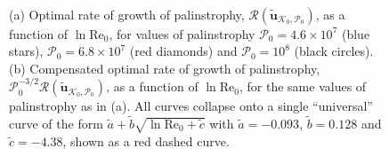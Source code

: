 \documentclass[11pt]{article}
\def\P{{\mathcal{P}}}
\def\R{{\mathcal{R}}}
\def\K{{\mathcal{K}}}
\newcommand{\Reyn}{\textrm{Re}}
\newcommand{\tuvecKP}{\widetilde{\mathbf{u}}_{\K_0,\P_0}}
\begin{document}
\begin{figure}
\linespread{1.1}
\setcounter{subfigure}{0}
\begin{center}
\\
\caption[Optimal $d\P/dt$ vs $\Reyn$]{
(a) Optimal rate of growth of palinstrophy, $\R(\tuvecKP)$, as a function of $\ln \Reyn_0$, 
for values of palinstrophy $\P_0 = 4.6\times 10^7$ (blue stars), $\P_0 = 6.8\times 10^7$ (red diamonds) and $\P_0 = 10^8$ (black circles). (b) Compensated optimal rate of growth of palinstrophy, $\P_0^{-3/2}\R(\tuvecKP)$, as a function of $\ln \Reyn_0$, for the same values of palinstrophy as in (a). All curves collapse onto a single ``universal'' curve of the form $\tilde{a} + \tilde{b}\sqrt{\ln \Reyn_0 + \tilde{c} }$ with $\tilde{a} = -0.093$, $\tilde{b} = 0.128$ and $\tilde{c} = -4.38$, shown as a red dashed curve.}
\label{fig:maxdP_vsRe}
\end{center}
\end{figure}
\end{document}
